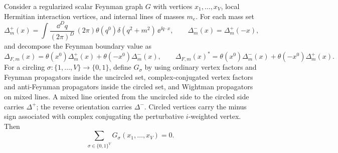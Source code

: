 \begin{proposition}
\label{prop:largest-time-identity}
Consider a regularized scalar Feynman graph \(G\) with vertices
\(x_1,\ldots,x_V\), local Hermitian interaction vertices, and internal lines
of masses \(m_e\).  For each mass set
\[
  \Delta_m^+(x)
  =
  \int
  \frac{\dd^D q}{(2\pi)^D}\,
  (2\pi)\theta(q^0)\delta(q^2+m^2)\,\ee^{\ii q\cdot x},
  \qquad
  \Delta_m^-(x)=\Delta_m^+(-x),
\]
and decompose the Feynman boundary value as
\[
  \Delta_{F,m}(x)
  =
  \theta(x^0)\Delta_m^+(x)+\theta(-x^0)\Delta_m^-(x),
  \qquad
  \Delta_{F,m}(x)^*
  =
  \theta(x^0)\Delta_m^-(x)+\theta(-x^0)\Delta_m^+(x).
\]
For a circling \(\sigma:\{1,\ldots,V\}\to\{0,1\}\), define \(G_\sigma\) by
using ordinary vertex factors and Feynman propagators inside the uncircled
set, complex-conjugated vertex factors and anti-Feynman propagators inside the
circled set, and Wightman propagators on mixed lines.  A mixed line oriented
from the uncircled side to the circled side carries \(\Delta^+\); the reverse
orientation carries \(\Delta^-\).  Circled vertices carry the minus sign
associated with complex conjugating the perturbative \(i\)-weighted vertex.
Then
\begin{equation}
  \sum_{\sigma\in\{0,1\}^V}G_\sigma(x_1,\ldots,x_V)=0 .
  \label{eq:largest-time-equation}
\end{equation}
\end{proposition}

